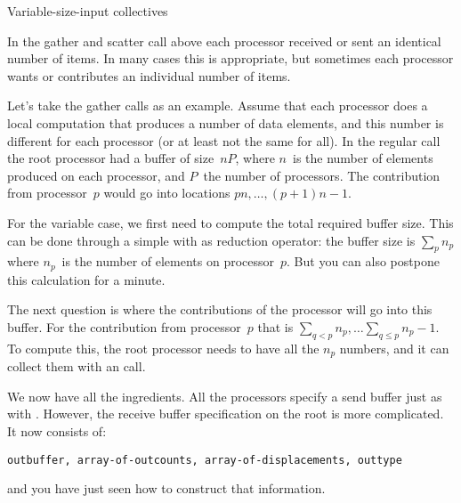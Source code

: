 
 {Variable-size-input collectives}
\label{sec:v-collective}

In the gather and scatter call above each processor received or sent
an identical number of items. In many cases this is appropriate, but
sometimes each processor wants or contributes an individual number of
items. 

Let's take the gather calls as an example. Assume that each processor 
does a local computation that produces a number of data elements,
and this number is different for each processor (or at least not
the same for all). In the regular  call the root processor
had a buffer of size~$nP$, where $n$~is the number of elements produced
on each processor, and $P$~the number of processors. The contribution
from processor~$p$ would go into locations $pn,\ldots,(p+1)n-1$.

For the variable case, we first need to compute the total required
buffer size. This can be done through a simple 
with  as reduction operator:
the buffer size is $\sum_p n_p$ where $n_p$~is the number of elements
on processor~$p$. But you can also postpone
this calculation for a minute. 

The next question is where the contributions of the processor will
go into this buffer. For the contribution from processor~$p$
that is $\sum_{q<p}n_p,\ldots\sum_{q\leq p}n_p-1$. To compute this,
the root processor needs to have all the $n_p$ numbers, and it can collect
them with an  call.

We now have all the ingredients.
All the processors specify a send buffer just as with .
However, the receive buffer specification on the root is more complicated. 
It now consists of:
\begin{verbatim}
outbuffer, array-of-outcounts, array-of-displacements, outtype
\end{verbatim}
and you have just seen how to construct that information.

